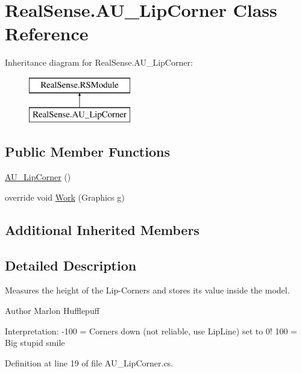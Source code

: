 \hypertarget{class_real_sense_1_1_a_u___lip_corner}{}\section{Real\+Sense.\+A\+U\+\_\+\+Lip\+Corner Class Reference}
\label{class_real_sense_1_1_a_u___lip_corner}
Inheritance diagram for Real\+Sense.\+A\+U\+\_\+\+Lip\+Corner\+:\begin{figure}[H]
\begin{center}
\leavevmode
\includegraphics[height=2.000000cm]{class_real_sense_1_1_a_u___lip_corner}
\end{center}
\end{figure}
\subsection*{Public Member Functions}
\begin{DoxyCompactItemize}
\item 
\hyperlink{class_real_sense_1_1_a_u___lip_corner_ae3bb4bd3aad86a0c83d5bc57b9bb0855}{A\+U\+\_\+\+Lip\+Corner} ()
\item 
override void \hyperlink{class_real_sense_1_1_a_u___lip_corner_a4a506c5dc50e7bcd8dcfa80cecbd7f56}{Work} (Graphics g)
\end{DoxyCompactItemize}
\subsection*{Additional Inherited Members}


\subsection{Detailed Description}
Measures the height of the Lip-\/\+Corners and stores its\textquotesingle{} value inside the model. \begin{DoxyAuthor}{Author}
Marlon  Hufflepuff
\end{DoxyAuthor}
Interpretation\+: -\/100 = Corners down (not reliable, use Lip\+Line) set to 0! 100 = Big stupid smile 

Definition at line 19 of file A\+U\+\_\+\+Lip\+Corner.\+cs.



